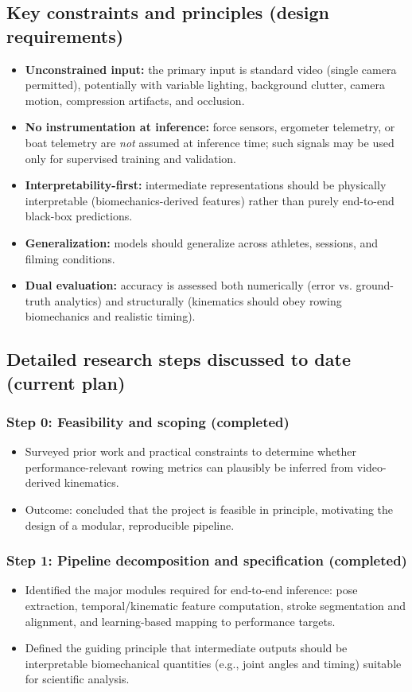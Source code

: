 \documentclass[11pt]{article}
\begin{document}
\subsection*{Key constraints and principles (design requirements)}
\begin{itemize}
  \item \textbf{Unconstrained input:} the primary input is standard video (single camera permitted), potentially with variable lighting, background clutter, camera motion, compression artifacts, and occlusion.
  \item \textbf{No instrumentation at inference:} force sensors, ergometer telemetry, or boat telemetry are \emph{not} assumed at inference time; such signals may be used only for supervised training and validation.
  \item \textbf{Interpretability-first:} intermediate representations should be physically interpretable (biomechanics-derived features) rather than purely end-to-end black-box predictions.
  \item \textbf{Generalization:} models should generalize across athletes, sessions, and filming conditions.
  \item \textbf{Dual evaluation:} accuracy is assessed both numerically (error vs. ground-truth analytics) and structurally (kinematics should obey rowing biomechanics and realistic timing).
\end{itemize}

\subsection*{Detailed research steps discussed to date (current plan)}
\subsubsection*{Step 0: Feasibility and scoping (completed)}
\begin{itemize}
  \item Surveyed prior work and practical constraints to determine whether performance-relevant rowing metrics can plausibly be inferred from video-derived kinematics.
  \item Outcome: concluded that the project is feasible in principle, motivating the design of a modular, reproducible pipeline.
\end{itemize}

\subsubsection*{Step 1: Pipeline decomposition and specification (completed)}
\begin{itemize}
  \item Identified the major modules required for end-to-end inference: pose extraction, temporal/kinematic feature computation, stroke segmentation and alignment, and learning-based mapping to performance targets.
  \item Defined the guiding principle that intermediate outputs should be interpretable biomechanical quantities (e.g., joint angles and timing) suitable for scientific analysis.
\end{itemize}
\end{document}
